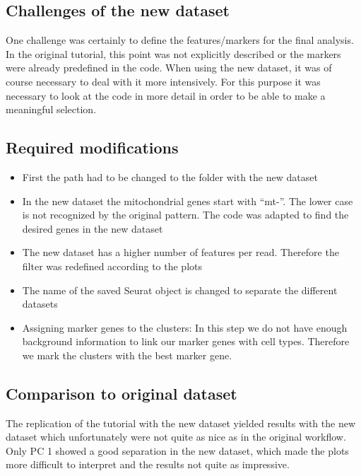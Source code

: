 \documentclass[a4paper, 10pt]{scrartcl}
\begin{document}
\hypertarget{challenges-of-the-new-dataset}{%
\subsection{Challenges of the new
dataset}\label{challenges-of-the-new-dataset}}

One challenge was certainly to define the features/markers for the final
analysis. In the original tutorial, this point was not explicitly
described or the markers were already predefined in the code. When using
the new dataset, it was of course necessary to deal with it more
intensively. For this purpose it was necessary to look at the code in
more detail in order to be able to make a meaningful selection.

\hypertarget{required-modifications}{%
\subsection{Required modifications}\label{required-modifications}}

\begin{itemize}
\item
  First the path had to be changed to the folder with the new dataset
\item
  In the new dataset the mitochondrial genes start with ``mt-''. The
  lower case is not recognized by the original pattern. The code was
  adapted to find the desired genes in the new dataset
\item
  The new dataset has a higher number of features per read. Therefore
  the filter was redefined according to the plots
\item
  The name of the saved Seurat object is changed to separate the
  different datasets
\item
  Assigning marker genes to the clusters: In this step we do not have
  enough background information to link our marker genes with cell
  types. Therefore we mark the clusters with the best marker gene.
\end{itemize}

\hypertarget{comparison-to-original-dataset}{%
\subsection{Comparison to original
dataset}\label{comparison-to-original-dataset}}

The replication of the tutorial with the new dataset yielded results
with the new dataset which unfortunately were not quite as nice as in
the original workflow. Only PC 1 showed a good separation in the new
dataset, which made the plots more difficult to interpret and the
results not quite as impressive.
\end{document}
